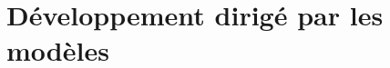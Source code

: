 \chapter{D\'eveloppement dirig\'e par les mod\`eles}\label{chap:dev}



\newpage


\newpage


\newpage


\newpage


\newpage


\newpage

